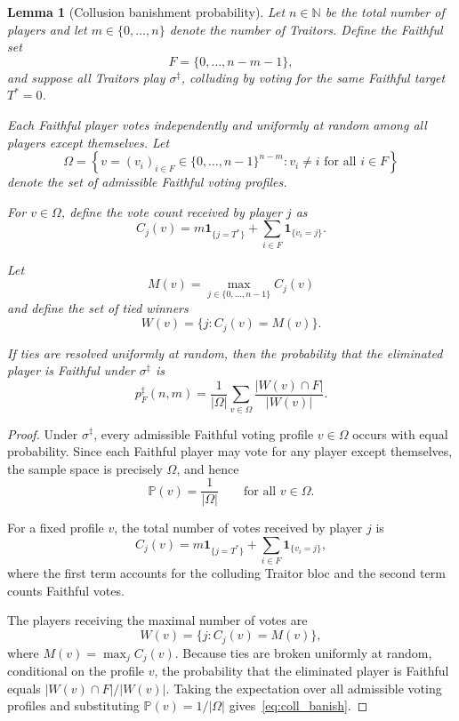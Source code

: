 \documentclass[10pt,a4paper]{amsart}
\newtheorem{lemma}{Lemma}
\begin{document}
\begin{lemma}[Collusion banishment probability]\label{lemma:collusion}
Let \(n \in \mathbb{N}\) be the total number of players and let
\(m \in \{0,\dots,n\}\) denote the number of Traitors. Define the
Faithful set
\[
F=\{0,\dots,n-m-1\},
\]
and suppose all Traitors play \(\sigma^\ddagger\), colluding by voting
for the same Faithful target \(T^\ast = 0\).

Each Faithful player votes independently and uniformly at random among
all players except themselves. Let
\[
\Omega
=
\left\{
v=(v_i)_{i\in F}\in \{0,\dots,n-1\}^{n-m}
:
v_i\neq i
\text{ for all } i\in F
\right\}
\]
denote the set of admissible Faithful voting profiles.

For \(v\in\Omega\), define the vote count received by player \(j\) as
\[
C_j(v)
=
m\mathbf 1_{\{j=T^\ast\}}
+
\sum_{i\in F}\mathbf 1_{\{v_i=j\}}.
\]

Let
\[
M(v)=\max_{j\in\{0,\dots,n-1\}} C_j(v)
\]
and define the set of tied winners
\[
W(v)=\{j : C_j(v)=M(v)\}.
\]

If ties are resolved uniformly at random, then the probability that the
eliminated player is Faithful under \(\sigma^\ddagger\) is
\begin{equation}\label{eq:coll_banish}
p_F^{\ddagger}(n,m)
=
\frac1{|\Omega|}
\sum_{v\in\Omega}
\frac{|W(v)\cap F|}{|W(v)|}.
\end{equation}
\end{lemma}

\begin{proof}
Under \(\sigma^\ddagger\), every admissible Faithful voting profile
\(v\in\Omega\) occurs with equal probability. Since each Faithful player
may vote for any player except themselves, the sample space is precisely
\(\Omega\), and hence
\[
\mathbb{P}(v)=\frac1{|\Omega|}
\qquad
\text{for all } v\in\Omega.
\]

For a fixed profile \(v\), the total number of votes received by player
\(j\) is
\[
C_j(v)
=
m\mathbf 1_{\{j=T^\ast\}}
+
\sum_{i\in F}\mathbf 1_{\{v_i=j\}},
\]
where the first term accounts for the colluding Traitor bloc and the
second term counts Faithful votes.

The players receiving the maximal number of votes are
\[
W(v)=\{j : C_j(v)=M(v)\},
\]
where \(M(v)=\max_j C_j(v)\). Because ties are broken uniformly at
random, conditional on the profile \(v\), the probability that the
eliminated player is Faithful equals \(|W(v)\cap F|/|W(v)|\). Taking
the expectation over all admissible voting profiles and substituting
\(\mathbb{P}(v)=1/|\Omega|\) gives~\eqref{eq:coll_banish}.
\end{proof}
\end{document}
